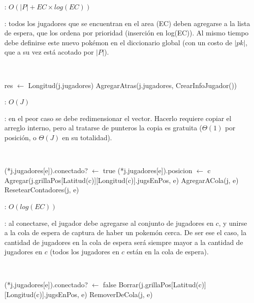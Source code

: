 \begin{Algoritmos}
	\complejidad: $O(|P| + EC \times log(EC))$

	\justifcomp: todos los jugadores que se encuentran en el area (EC) deben agregarse a la lista de espera, que los ordena por prioridad (inserción en log(EC)). Al mismo tiempo debe definirse este nuevo pokémon en el diccionario global (con un costo de $|pk|$, que a su vez está acotado por $|P|$).

	~

	\begin{algorithm}[H]
		\NoCaptionOfAlgo
		\caption{}
		res $\leftarrow$ Longitud(j.jugadores)
		AgregarAtras(j.jugadores, CrearInfoJugador())
	\end{algorithm}

	\complejidad: $O(J)$

	\justifcomp: en el peor caso se debe redimensionar el vector. Hacerlo requiere copiar el arreglo interno, pero al tratarse de punteros la copia es gratuita ($\Theta(1)$ por posición, o $\Theta(J)$ en su totalidad).

	~

	\begin{algorithm}[H]
		\NoCaptionOfAlgo
		\caption{}
		(*j.jugadores[e]).conectado? $\leftarrow$ true
		(*j.jugadores[e]).posicion $\leftarrow$ c
		Agregar(j.grillaPos[Latitud(c)][Longitud(c)].jugsEnPos, e)
		AgregarACola(j, e)
		ResetearContadores(j, e)
	\end{algorithm}

	\complejidad: $O(log(EC))$

	\justifcomp: al conectarse, el jugador debe agregarse al conjunto de jugadores en $c$, y unirse a la cola de espera de captura de haber un pokemón cerca. De ser ese el caso, la cantidad de jugadores en la cola de espera será siempre mayor a la cantidad de jugadores en $c$ (todos los jugadores en $c$ están en la cola de espera).

	~

	\begin{algorithm}[H]
		\NoCaptionOfAlgo
		\caption{}
		(*j.jugadores[e]).conectado? $\leftarrow$ false
		Borrar(j.grillaPos[Latitud(c)][Longitud(c)].jugsEnPos, e)
		RemoverDeCola(j, e)
	\end{algorithm}


\end{Algoritmos}
